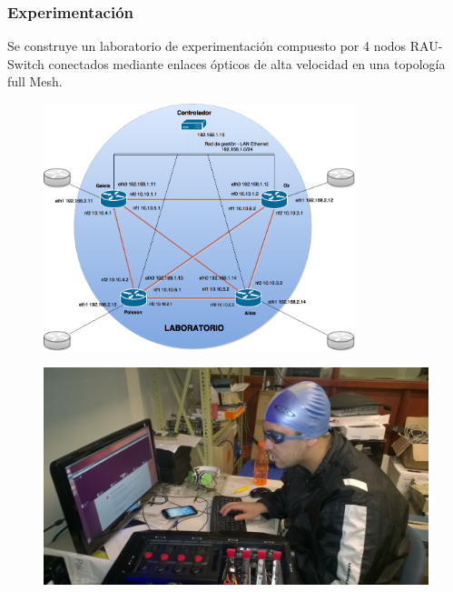 \documentclass{beamer}
\begin{document}
\begin{frame}
\frametitle{Experimentaci\'on} 

Se construye un laboratorio de experimentaci\'on compuesto por 4 nodos RAU-Switch conectados mediante enlaces \'opticos de alta velocidad en una topolog\'ia full Mesh.

\vspace{0.5cm}
\begin{minipage}{0.60\textwidth}
\begin{figure}[htbp]
\centering
\includegraphics[width=0.81\textwidth]{imagenes/Topologia.png}\hfill
\end{figure}
\end{minipage}
\hfill
\begin{minipage}{0.35\textwidth}
\begin{figure}[H]
\centering
\includegraphics[width=1.0\textwidth]{imagenes/laboratorio.jpg}
\end{figure}
\end{minipage} 

\end{frame}
\end{document}
